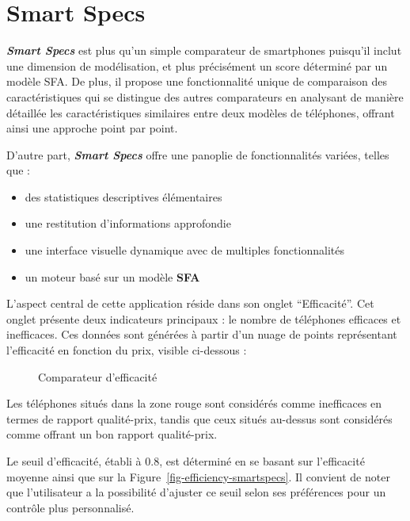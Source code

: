 \documentclass[
  12pt,
]{report}
\providecommand{\tightlist}{%
  \setlength{\itemsep}{0pt}\setlength{\parskip}{0pt}}\usepackage{longtable,booktabs,array}
\renewcommand{\texttt}[1]{\colorbox{light}{\color{highlight}{\ttfamily{#1}}}}
\begin{document}
\section{Smart Specs}\label{smart-specs}

\textbf{\emph{Smart Specs}} est plus qu'un simple comparateur de
smartphones puisqu'il inclut une dimension de modélisation, et plus
précisément un score déterminé par un modèle SFA. De plus, il propose
une fonctionnalité unique de comparaison des caractéristiques qui se
distingue des autres comparateurs en analysant de manière détaillée les
caractéristiques similaires entre deux modèles de téléphones, offrant
ainsi une approche point par point.

D'autre part, \textbf{\emph{Smart Specs}} offre une panoplie de
fonctionnalités variées, telles que :

\begin{itemize}
\tightlist
\item
  des statistiques descriptives élémentaires
\item
  une restitution d'informations approfondie
\item
  une interface visuelle dynamique avec de multiples fonctionnalités
\item
  un moteur basé sur un modèle \textbf{SFA}
\end{itemize}

L'aspect central de cette application réside dans son onglet
``Efficacité''. Cet onglet présente deux indicateurs principaux : le
nombre de téléphones efficaces et inefficaces. Ces données sont générées
à partir d'un nuage de points représentant l'efficacité en fonction du
prix, visible ci-dessous :

\begin{figure}[htbp]
    \centering
    \texttt{[image: imgs/graphefficacité.jpg]}
    \caption{Comparateur d'efficacité}
    \label{fig:example}
\end{figure}

Les téléphones situés dans la zone rouge sont considérés comme
inefficaces en termes de rapport qualité-prix, tandis que ceux situés
au-dessus sont considérés comme offrant un bon rapport qualité-prix.

Le seuil d'efficacité, établi à 0.8, est déterminé en se basant sur
l'efficacité moyenne ainsi que sur la
Figure~\ref{fig-efficiency-smartspecs}. Il convient de noter que
l'utilisateur a la possibilité d'ajuster ce seuil selon ses préférences
pour un contrôle plus personnalisé.
\end{document}
